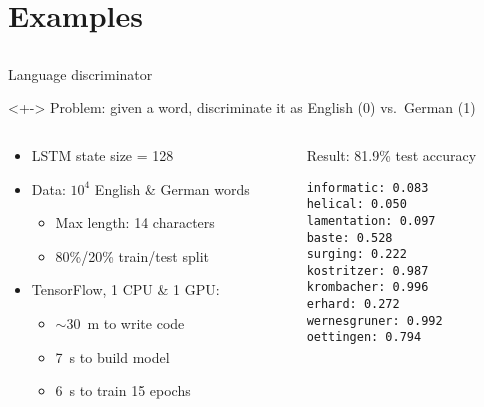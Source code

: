 \section{Examples}
\subsection{}

\begin{frame}[fragile]{Language discriminator}
    \begin{block}{}<+->
        Problem: given a word, discriminate it as English (0) vs.\ German (1)
    \end{block}

    \centering
    

    \begin{columns}
        \begin{column}{0.61\textwidth}
            \vspace{-5mm}
            \begin{itemize}
                \item LSTM state size = 128
                \pause
                \item Data: $10^4$ English \& German words
                \begin{itemize}
                    \item Max length: 14 characters
                    \item 80\%/20\% train/test split
                \end{itemize}
                \pause
                \item TensorFlow, 1 CPU \& 1 GPU:
                \begin{itemize}
                    \item $\sim$30~m to write code
                    \item 7~s to build model
                    \item 6~s to train 15 epochs
                \end{itemize}
            \end{itemize}
        \end{column}
        \begin{column}{0.39\textwidth}
            \pause
            Result: 81.9\% test accuracy
            \vspace{-17pt}
            \footnotesize
\begin{verbatim}
informatic: 0.083
helical: 0.050
lamentation: 0.097
baste: 0.528
surging: 0.222
kostritzer: 0.987
krombacher: 0.996
erhard: 0.272
wernesgruner: 0.992
oettingen: 0.794
\end{verbatim}
        \end{column}
    \end{columns}
\end{frame}



